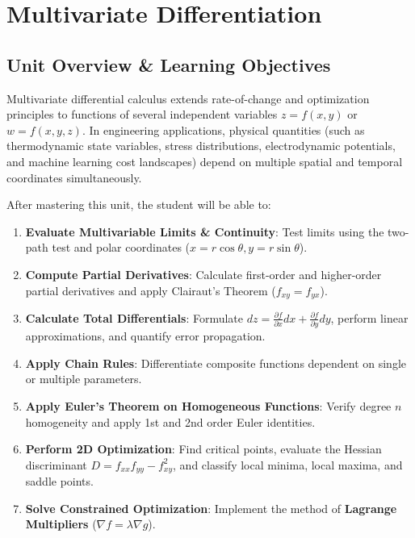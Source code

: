 \chapter{Multivariate Differentiation}
\label{chap:multivariate-differentiation}

\section{Unit Overview \& Learning Objectives}

Multivariate differential calculus extends rate-of-change and optimization principles to functions of several independent variables $z = f(x,y)$ or $w = f(x,y,z)$. In engineering applications, physical quantities (such as thermodynamic state variables, stress distributions, electrodynamic potentials, and machine learning cost landscapes) depend on multiple spatial and temporal coordinates simultaneously.

\begin{important}
After mastering this unit, the student will be able to:
\begin{enumerate}[leftmargin=1.5em]
    \item \textbf{Evaluate Multivariable Limits \& Continuity}: Test limits using the two-path test and polar coordinates ($x = r\cos\theta, y = r\sin\theta$).
    \item \textbf{Compute Partial Derivatives}: Calculate first-order and higher-order partial derivatives and apply Clairaut's Theorem ($f_{xy} = f_{yx}$).
    \item \textbf{Calculate Total Differentials}: Formulate $dz = \frac{\partial f}{\partial x}dx + \frac{\partial f}{\partial y}dy$, perform linear approximations, and quantify error propagation.
    \item \textbf{Apply Chain Rules}: Differentiate composite functions dependent on single or multiple parameters.
    \item \textbf{Apply Euler's Theorem on Homogeneous Functions}: Verify degree $n$ homogeneity and apply 1st and 2nd order Euler identities.
    \item \textbf{Perform 2D Optimization}: Find critical points, evaluate the Hessian discriminant $D = f_{xx}f_{yy} - f_{xy}^2$, and classify local minima, local maxima, and saddle points.
    \item \textbf{Solve Constrained Optimization}: Implement the method of \textbf{Lagrange Multipliers} ($\nabla f = \lambda \nabla g$).
\end{enumerate}
\end{important}

